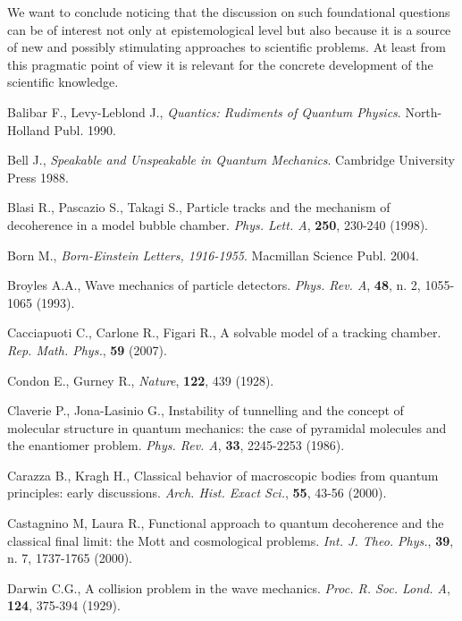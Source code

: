 \documentclass[12pt,reqno]{amsart}
\newcommand{\n}{\relax}
\newcommand{\vs}{\vspace{0.5cm}}
\numberwithin{equation}{section}
\begin{document}
\n
We want to conclude noticing  that the discussion  on  such foundational  questions can be of interest  not  only at epistemological level but also because it is  a source  of new and possibly stimulating  approaches to scientific problems. At least from this pragmatic point of view  it is relevant  for the concrete development of the scientific knowledge.

\vs
\vs
\vs
\vs
\vs

\begin{thebibliography}{99}
\vs



 Balibar F., Levy-Leblond J., {\em Quantics: Rudiments of Quantum Physics}. North-Holland Publ. 1990.


 Bell J., {\em Speakable and Unspeakable in Quantum Mechanics}. Cambridge University Press  1988.

 Blasi R., Pascazio S., Takagi S., Particle tracks and the mechanism of decoherence in a model bubble chamber. {\em Phys. Lett. A}, {\bf 250}, 230-240 (1998).


 Born M., {\em Born-Einstein Letters, 1916-1955}. Macmillan Science Publ. 2004.

 Broyles A.A., Wave mechanics of particle detectors. {\em Phys. Rev. A}, {\bf 48}, n. 2, 1055-1065 (1993).

 Cacciapuoti C., Carlone R., Figari R., 
A solvable model of a tracking chamber. 
{\em Rep. Math. Phys.}, {\bf 59} (2007).

 Condon E., Gurney R., {\em Nature}, {\bf 122}, 439 (1928).

 Claverie P., Jona-Lasinio G., Instability of tunnelling and the concept of molecular structure in quantum mechanics: the case of pyramidal molecules and the enantiomer problem. {\em Phys. Rev. A}, {\bf 33}, 2245-2253 (1986).

 Carazza B., Kragh H., Classical  behavior of macroscopic bodies from quantum principles: early discussions. {\em Arch. Hist. Exact Sci.}, {\bf 55}, 43-56 (2000).



 Castagnino M, Laura R., Functional approach to quantum decoherence and the classical final limit: the Mott and cosmological problems. {\em Int. J. Theo. Phys.}, {\bf 39}, n. 7, 1737-1765 (2000).

 Darwin C.G., A collision problem in the wave mechanics. {\em Proc. R. Soc.
Lond. A}, {\bf  124}, 375-394 (1929).


\end{thebibliography}
\end{document}
